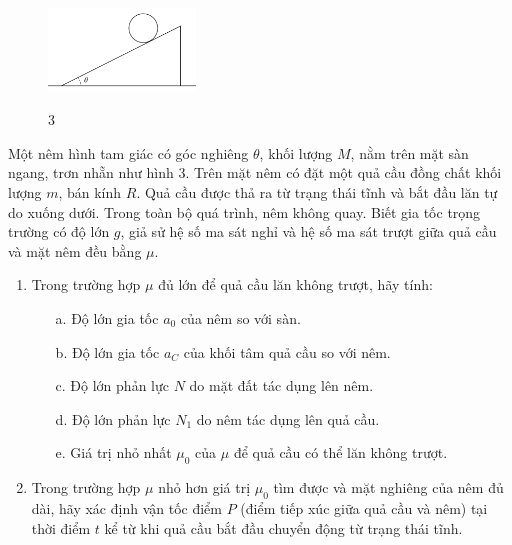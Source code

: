 \begin{figure}
  \centering
  \vspace{-35px}
  \includegraphics[width=0.35\textwidth]{images/Hinh 3.PNG}
  \begin{center}
    \figurename{ 3}
  \end{center}
\end{figure}

\vspace{-30px}
\noindent Một nêm hình tam giác có góc nghiêng $\theta$, khối lượng $M$, nằm trên mặt sàn ngang, trơn nhẵn như hình 3. Trên mặt nêm có đặt một quả cầu đồng chất khối lượng $m$, bán kính $R$. Quả cầu được thả ra từ trạng thái tĩnh và bắt đầu lăn tự do xuống dưới. Trong toàn bộ quá trình, nêm không quay. Biết gia tốc trọng trường có độ lớn $g$, giả sử hệ số ma sát nghỉ và hệ số ma sát trượt giữa quả cầu và mặt nêm đều bằng $\mu$.
\begin{enumerate}
  \item Trong trường hợp $\mu$ đủ lớn để quả cầu lăn không trượt, hãy tính:
        \begin{enumerate}
          \item[a.] Độ lớn gia tốc $a_{0}$ của nêm so với sàn.
          \item[b.] Độ lớn gia tốc $a_{C}$ của khối tâm quả cầu so với nêm.
          \item[c.] Độ lớn phản lực $N$ do mặt đất tác dụng lên nêm.
          \item[d.] Độ lớn phản lực $N_{1}$ do nêm tác dụng lên quả cầu.
          \item[e.] Giá trị nhỏ nhất $\mu_{0}$ của $\mu$ để quả cầu có thể lăn không trượt.
        \end{enumerate}
  \item Trong trường hợp $\mu$ nhỏ hơn giá trị $\mu_{0}$ tìm được và mặt nghiêng của nêm đủ dài, hãy xác định vận tốc điểm $P$ (điểm tiếp xúc giữa quả cầu và nêm) tại thời điểm $t$ kể từ khi quả cầu bắt đầu chuyển động từ trạng thái tĩnh.
\end{enumerate}